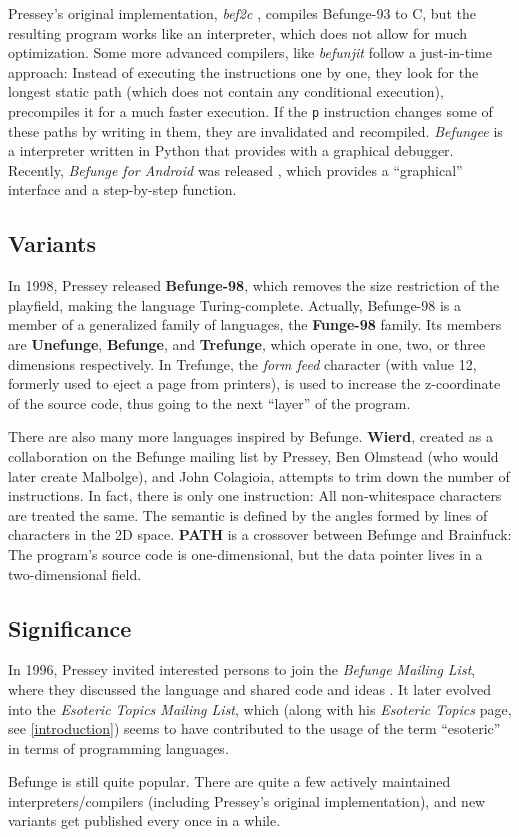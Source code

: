 Pressey's original implementation, \emph{bef2c} \cite{pressey1993befunge}, compiles Befunge-93 to C, but the resulting program works like an interpreter, which does not allow for much optimization. Some more advanced compilers, like \emph{befunjit} \cite{toncean_befunge} follow a just-in-time approach: Instead of executing the instructions one by one, they look for the longest static path (which does not contain any conditional execution), precompiles it for a much faster execution. If the \texttt{p} instruction changes some of these paths by writing in them, they are invalidated and recompiled. \emph{Befungee} \cite{mcenroe_befunge} is a interpreter written in Python that provides with a graphical debugger. Recently, \emph{Befunge for Android} was released \cite{alexander_befunge}, which provides a “graphical” interface and a step-by-step function.

\subsection{Variants}

In 1998, Pressey released \textbf{Befunge-98}, which removes the size restriction of the playfield, making the language Turing-complete. Actually, Befunge-98 is a member of a generalized family of languages, the \textbf{Funge-98} family. Its members are \textbf{Unefunge}, \textbf{Befunge}, and \textbf{Trefunge}, which operate in one, two, or three dimensions respectively. In Trefunge, the \emph{form feed} character (with \ascii{} value 12, formerly used to eject a page from printers), is used to increase the z-coordinate of the source code, thus going to the next “layer” of the program.

There are also many more languages inspired by Befunge. \textbf{Wierd}, created as a collaboration on the Befunge mailing list by Pressey, Ben Olmstead (who would later create Malbolge), and John Colagioia, attempts to trim down the number of instructions. In fact, there is only one instruction: All non-whitespace characters are treated the same. The semantic is defined by the angles formed by lines of characters in the 2D space. \textbf{PATH} is a crossover between Befunge and Brainfuck: The program's source code is one-dimensional, but the data pointer lives in a two-dimensional field.

\subsection{Significance}

In 1996, Pressey invited interested persons to join the \emph{Befunge Mailing List}, where they discussed the language and shared code and ideas \cite{pressey1996welcome}. It later evolved into the \emph{Esoteric Topics Mailing List}, which (along with his \emph{Esoteric Topics} page, see \cref{introduction}) seems to have contributed to the usage of the term “esoteric” in terms of programming languages.

Befunge is still quite popular. There are quite a few actively maintained interpreters/compilers (including Pressey's original implementation), and new variants get published every once in a while.
